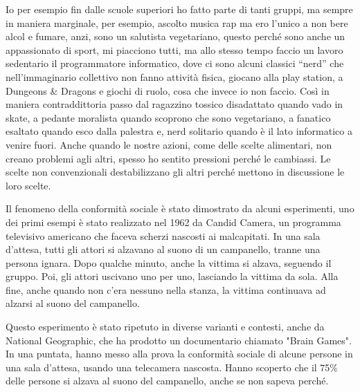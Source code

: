 \documentclass[12pt]{book} %
\begin{document}
Io per esempio fin dalle scuole superiori ho fatto parte di tanti gruppi, ma sempre in maniera marginale, per esempio,
ascolto musica rap ma ero l'unico a non bere alcol e fumare, anzi, sono un salutista vegetariano,
questo perché sono anche un appassionato di sport, mi piacciono tutti, ma allo stesso tempo faccio un lavoro sedentario
il programmatore informatico, dove ci sono alcuni classici “nerd” che nell'immaginario
collettivo non fanno attività fisica, giocano alla play station, a Dungeons \& Dragons e giochi di ruolo, cosa che invece io non faccio. Così in maniera contraddittoria passo dal ragazzino tossico disadattato quando
vado in skate, a pedante moralista quando scoprono che sono vegetariano, a fanatico esaltato quando esco dalla palestra
e, nerd solitario quando è il lato informatico a venire fuori.
Anche quando le nostre azioni, come delle scelte alimentari, non creano problemi agli altri, spesso ho sentito pressioni perché le cambiassi.
Le scelte non convenzionali destabilizzano gli altri perché mettono in discussione le loro scelte.

\bigskip

Il fenomeno della conformità sociale è stato dimostrato da alcuni esperimenti, uno dei primi esempi è stato realizzato nel 1962 da Candid Camera, un programma televisivo americano che faceva scherzi nascosti ai malcapitati. In una sala d'attesa, tutti gli attori si alzavano al suono di un campanello, tranne una persona ignara. Dopo qualche minuto, anche la vittima si alzava, seguendo il gruppo. Poi, gli attori uscivano uno per uno, lasciando la vittima da sola. Alla fine, anche quando non c'era nessuno nella stanza, la vittima continuava ad alzarsi al suono del campanello.

Questo esperimento è stato ripetuto in diverse varianti e contesti, anche da National Geographic, che ha prodotto un documentario chiamato "Brain Games". In una puntata, hanno messo alla prova la conformità sociale di alcune persone in una sala d'attesa, usando una telecamera nascosta. Hanno scoperto che il 75\% delle persone si alzava al suono del campanello, anche se non sapeva perché.


\bigskip
\end{document}

